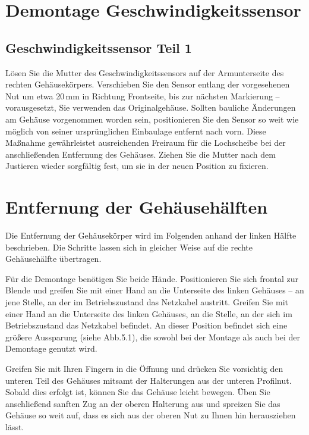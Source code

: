 %
%

\chapter {Demontage Geschwindigkeitssensor}

\section{Geschwindigkeitssensor Teil 1}
Lösen Sie die Mutter des Geschwindigkeitssensors auf der Armunterseite des rechten Gehäusekörpers. Verschieben Sie den Sensor entlang der vorgesehenen Nut um etwa 20 mm in Richtung Frontseite, bis zur nächsten Markierung – vorausgesetzt, Sie verwenden das Originalgehäuse.
Sollten bauliche Änderungen am Gehäuse vorgenommen worden sein, positionieren Sie den Sensor so weit wie möglich von seiner ursprünglichen Einbaulage entfernt nach vorn.
Diese Maßnahme gewährleistet ausreichenden Freiraum für die Lochscheibe bei der anschließenden Entfernung des Gehäuses. Ziehen Sie die Mutter nach dem Justieren wieder sorgfältig fest, um sie in der neuen Position zu fixieren.


\chapter{Entfernung der Gehäusehälften}

Die Entfernung der Gehäusekörper wird im Folgenden anhand der linken Hälfte beschrieben. Die Schritte lassen sich in gleicher Weise auf die rechte Gehäusehälfte übertragen.

Für die Demontage benötigen Sie beide Hände. Positionieren Sie sich frontal zur Blende und greifen Sie mit einer Hand an die Unterseite des linken Gehäuses – an jene Stelle, an der im Betriebszustand das Netzkabel austritt. 
Greifen Sie mit einer Hand an die Unterseite des linken Gehäuses, an die Stelle, an der sich im Betriebszustand das Netzkabel befindet. An dieser Position befindet sich eine größere Aussparung (siehe Abb.5.1), die sowohl bei der Montage als auch bei der Demontage genutzt wird.

Greifen Sie mit Ihren Fingern in die Öffnung und drücken Sie vorsichtig den unteren Teil des Gehäuses mitsamt der Halterungen aus der unteren Profilnut. Sobald dies erfolgt ist, können Sie das Gehäuse leicht bewegen. Üben Sie anschließend sanften Zug an der oberen Halterung aus und spreizen Sie das Gehäuse so weit auf, dass es sich aus der oberen Nut zu Ihnen hin herausziehen lässt.


